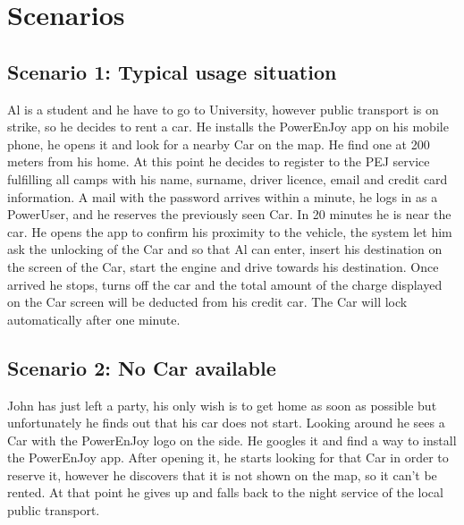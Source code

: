 \section{Scenarios}

\subsection{Scenario 1: Typical usage situation}
Al is a student and he have to go to University, however public transport is on strike, so he decides to rent a car.  He installs the PowerEnJoy app on his mobile phone, he opens it and look for a nearby Car on the map. He find one at 200 meters from his home. At this point he decides to register to the PEJ service fulfilling all camps with his name, surname, driver licence, email and credit card information. A mail with the password arrives within a minute, he logs in as a PowerUser, and he reserves the previously seen Car. In 20 minutes he is near the car. He opens the app to confirm his proximity to the vehicle, the system let him ask the unlocking of the Car and so that Al can enter, insert his destination on the screen of the Car, start the engine and drive towards his destination. Once arrived he stops, turns off the car and the total amount of the charge displayed on the Car screen will be deducted from his credit car. The Car will lock automatically after one minute. 

\subsection{Scenario 2: No Car available}
John has just left a party, his only wish is to get home as soon as possible but unfortunately he finds out that his car does not start. Looking around he sees a Car with the PowerEnJoy logo on the side. He googles it and find a way to install the PowerEnJoy app. After opening it, he starts looking for that Car in order to reserve it, however he discovers that it is not shown on the map, so it can't be rented. At that point he gives up and falls back to the night service of the local public transport.

